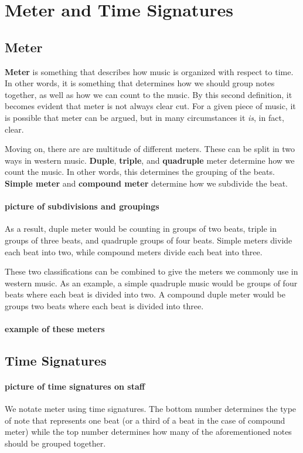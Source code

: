 \documentclass[../OpenAppliedMusicTheory.tex]{subfiles}
\begin{document}
    \section{Meter and Time Signatures}\label{ch2:meter}
        \subsection{Meter}
        \textbf{Meter} is something that describes how music is organized with respect to time. In other words, it is something that determines how we should group notes together, as well as how we can count to the music. By this second definition, it becomes evident that meter is not always clear cut. For a given piece of music, it is possible that meter can be argued, but in many circumstances it \emph{is}, in fact, clear.

        Moving on, there are are multitude of different meters. These can be split in two ways in western music. \textbf{Duple}, \textbf{triple}, and \textbf{quadruple} meter determine how we count the music. In other words, this determines the grouping of the beats. \textbf{Simple meter} and \textbf{compound meter} determine how we subdivide the beat. 

        \paragraph{picture of subdivisions and groupings}As a result, duple meter would be counting in groups of two beats, triple in groups of three beats, and quadruple groups of four beats. Simple meters divide each beat into two, while compound meters divide each beat into three. 

        These two classifications can be combined to give the meters we commonly use in western music. As an example, a simple quadruple music would be groups of four beats where each beat is divided into two. A compound duple meter would be groups two beats where each beat is divided into three.

        \paragraph{example of these meters}

        \subsection{Time Signatures}
        \paragraph{picture of time signatures on staff}
        We notate meter using time signatures. The bottom number determines the type of note that represents one beat (or a third of a beat in the case of compound meter) while the top number determines how many of the aforementioned notes should be grouped together.
\end{document}
